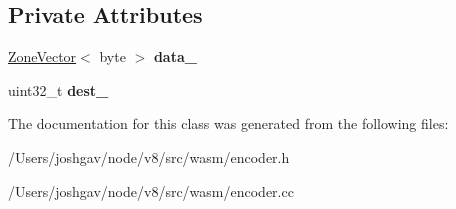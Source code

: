 \subsection*{Private Attributes}
\begin{DoxyCompactItemize}
\item 
\hyperlink{classv8_1_1internal_1_1_zone_vector}{Zone\+Vector}$<$ byte $>$ {\bfseries data\+\_\+}\hypertarget{classv8_1_1internal_1_1wasm_1_1_wasm_data_segment_encoder_ac82a79655bf40c0b08ec6862f4475773}{}\label{classv8_1_1internal_1_1wasm_1_1_wasm_data_segment_encoder_ac82a79655bf40c0b08ec6862f4475773}

\item 
uint32\+\_\+t {\bfseries dest\+\_\+}\hypertarget{classv8_1_1internal_1_1wasm_1_1_wasm_data_segment_encoder_ae2f8e1eeca32b2977630b81592e84e1e}{}\label{classv8_1_1internal_1_1wasm_1_1_wasm_data_segment_encoder_ae2f8e1eeca32b2977630b81592e84e1e}

\end{DoxyCompactItemize}


The documentation for this class was generated from the following files\+:\begin{DoxyCompactItemize}
\item 
/\+Users/joshgav/node/v8/src/wasm/encoder.\+h\item 
/\+Users/joshgav/node/v8/src/wasm/encoder.\+cc\end{DoxyCompactItemize}
